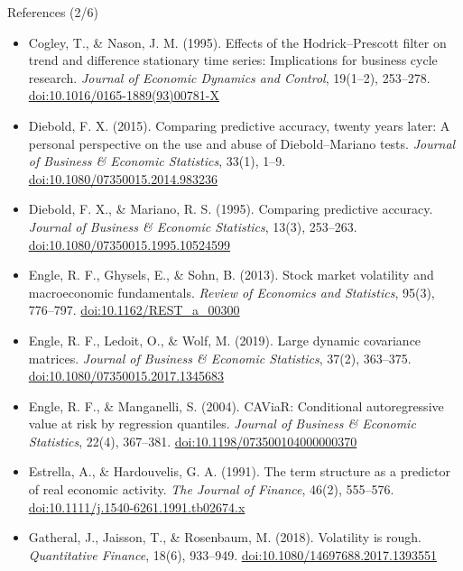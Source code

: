 \begin{frame}{References (2/6)}
\itemsize{\tiny}
\begin{itemize}
    \item Cogley, T., \& Nason, J. M. (1995). Effects of the Hodrick--Prescott filter on trend and difference stationary time series: Implications for business cycle research. \textit{Journal of Economic Dynamics and Control}, 19(1--2), 253--278. \href{https://doi.org/10.1016/0165-1889(93)00781-X}{doi:10.1016/0165-1889(93)00781-X}
    \item Diebold, F. X. (2015). Comparing predictive accuracy, twenty years later: A personal perspective on the use and abuse of Diebold--Mariano tests. \textit{Journal of Business \& Economic Statistics}, 33(1), 1--9. \href{https://doi.org/10.1080/07350015.2014.983236}{doi:10.1080/07350015.2014.983236}
    \item Diebold, F. X., \& Mariano, R. S. (1995). Comparing predictive accuracy. \textit{Journal of Business \& Economic Statistics}, 13(3), 253--263. \href{https://doi.org/10.1080/07350015.1995.10524599}{doi:10.1080/07350015.1995.10524599}
    \item Engle, R. F., Ghysels, E., \& Sohn, B. (2013). Stock market volatility and macroeconomic fundamentals. \textit{Review of Economics and Statistics}, 95(3), 776--797. \href{https://doi.org/10.1162/REST_a_00300}{doi:10.1162/REST\_a\_00300}
    \item Engle, R. F., Ledoit, O., \& Wolf, M. (2019). Large dynamic covariance matrices. \textit{Journal of Business \& Economic Statistics}, 37(2), 363--375. \href{https://doi.org/10.1080/07350015.2017.1345683}{doi:10.1080/07350015.2017.1345683}
    \item Engle, R. F., \& Manganelli, S. (2004). CAViaR: Conditional autoregressive value at risk by regression quantiles. \textit{Journal of Business \& Economic Statistics}, 22(4), 367--381. \href{https://doi.org/10.1198/073500104000000370}{doi:10.1198/073500104000000370}
    \item Estrella, A., \& Hardouvelis, G. A. (1991). The term structure as a predictor of real economic activity. \textit{The Journal of Finance}, 46(2), 555--576. \href{https://doi.org/10.1111/j.1540-6261.1991.tb02674.x}{doi:10.1111/j.1540-6261.1991.tb02674.x}
    \item Gatheral, J., Jaisson, T., \& Rosenbaum, M. (2018). Volatility is rough. \textit{Quantitative Finance}, 18(6), 933--949. \href{https://doi.org/10.1080/14697688.2017.1393551}{doi:10.1080/14697688.2017.1393551}

\end{itemize}
\end{frame}

